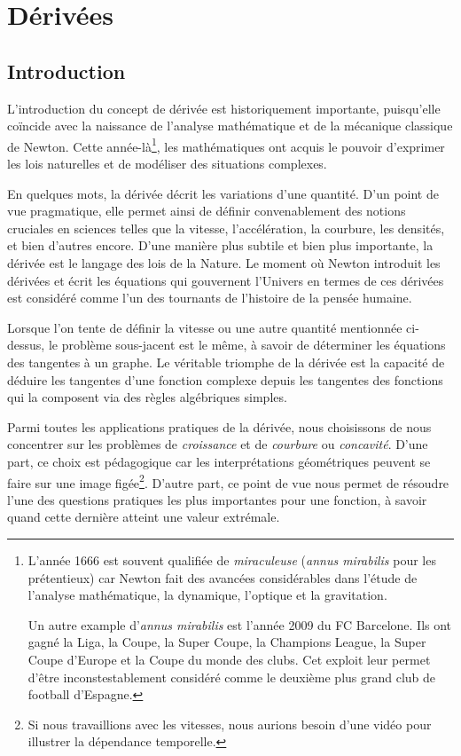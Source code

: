 \documentclass[main.tex]{subfiles}
\begin{document}
\chapter{Dérivées}

\section{Introduction}

L'introduction du concept de dérivée est historiquement importante,
puisqu'elle coïncide avec la naissance de l'analyse mathématique et de la mécanique classique de Newton.
Cette année-là\footnote{%
    L'année 1666 est souvent qualifiée de \emph{miraculeuse} (\emph{annus mirabilis} pour les prétentieux)
    car Newton fait des avancées considérables dans l'étude de
    l'analyse mathématique, la dynamique, l'optique et la gravitation.

    Un autre example d'\emph{annus mirabilis} est l'année 2009 du FC Barcelone.
    Ils ont gagné la Liga, la Coupe, la Super Coupe, la Champions League, la Super Coupe d'Europe et la Coupe du monde des clubs.
    Cet exploit leur permet d'être inconstestablement considéré comme le deuxième plus grand club de football d'Espagne.
},
les mathématiques ont acquis le pouvoir d'exprimer les lois naturelles et de modéliser des situations complexes.

En quelques mots,
la dérivée décrit les variations d'une quantité.
D'un point de vue pragmatique,
elle permet ainsi de définir convenablement des notions cruciales en sciences
telles que la vitesse, l'accélération, la courbure, les densités, et bien d'autres encore.
D'une manière plus subtile et bien plus importante,
la dérivée est le langage des lois de la Nature.
Le moment où Newton introduit les dérivées
et écrit les équations qui gouvernent l'Univers en termes de ces dérivées
est considéré comme l'un des tournants de l'histoire de la pensée humaine.

Lorsque l'on tente de définir la vitesse ou une autre quantité mentionnée ci-dessus,
le problème sous-jacent est le même,
à savoir de déterminer les équations des tangentes à un graphe.
Le véritable triomphe de la dérivée
est la capacité de déduire les tangentes d'une fonction complexe
depuis les tangentes des fonctions qui la composent
via des règles algébriques simples.

Parmi toutes les applications pratiques de la dérivée,
nous choisissons de nous concentrer sur les problèmes de \emph{croissance} et de \emph{courbure} ou \emph{concavité}.
D'une part,
ce choix est pédagogique car les interprétations géométriques peuvent se faire sur une image figée\footnote{%
    Si nous travaillions avec les vitesses,
    nous aurions besoin d'une vidéo pour illustrer la dépendance temporelle.
}.
D'autre part,
ce point de vue nous permet de résoudre l'une des questions pratiques les plus importantes pour une fonction,
à savoir quand cette dernière atteint une valeur extrémale.
\end{document}
